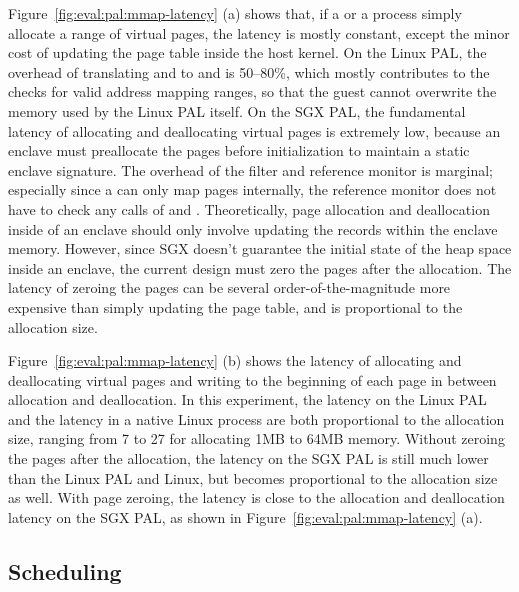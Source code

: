 Figure~\ref{fig:eval:pal:mmap-latency} (a)
shows that, if a \picoproc{} or a process simply allocate a range of virtual pages,
the latency is mostly constant,
except the minor cost of updating the page table
inside the host kernel.
On the Linux PAL, the overhead of translating  and  
to  and 
is 50--80\%,
which mostly contributes to the checks for valid address mapping ranges, so that the guest cannot overwrite the memory used by the Linux PAL itself.
On the SGX PAL, the fundamental latency of allocating and deallocating virtual pages is extremely low,
because an enclave must preallocate the pages before initialization to maintain a static enclave signature.
The overhead of the \seccomp{} filter and reference monitor is marginal; especially since a \picoproc{} can only map pages internally, the reference monitor does not have to check any calls of  and .
Theoretically, page allocation and deallocation
inside of an enclave should only involve updating
the records within the enclave memory.
However,
since SGX doesn't guarantee the initial state of the heap space inside an enclave,
the current design must zero the pages
after the allocation.
The latency of zeroing the pages can be several order-of-the-magnitude more expensive than
simply updating the page table,
and is proportional to the allocation size.



Figure~\ref{fig:eval:pal:mmap-latency} (b)
shows the latency of allocating and deallocating virtual pages
and writing to the beginning of each page in between allocation and deallocation.
In this experiment, the latency on the Linux PAL and the latency in a native Linux process
are both proportional to the allocation size,
ranging from 7\usec{} to 27\usec{} for allocating 1MB to 64MB memory.
Without zeroing the pages after the allocation,
the latency on the SGX PAL is still much lower than the Linux PAL and Linux, but becomes proportional
to the allocation size as well.
With page zeroing, the latency is close to the allocation and deallocation latency on the SGX PAL,
as shown in Figure~\ref{fig:eval:pal:mmap-latency} (a).







\subsection{Scheduling}
\label{sec:eval:pal:sched}

